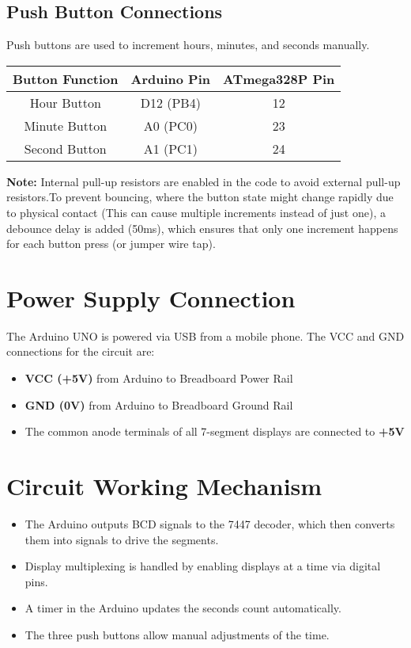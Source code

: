 \documentclass[a4paper,12pt]{article}
\theoremstyle{remark}
\begin{document}
\subsection{Push Button Connections}
Push buttons are used to increment hours, minutes, and seconds manually.
\begin{table}[h]
    \centering
    \begin{tabular}{|c|c|c|}
        \hline
        \textbf{Button Function} & \textbf{Arduino Pin} & \textbf{ATmega328P Pin} \\
        \hline
        Hour Button   & D12 (PB4)  & 12  \\
        Minute Button & A0 (PC0)   & 23  \\
        Second Button & A1 (PC1)   & 24  \\
        \hline
    \end{tabular}
    \label{tab:button_pins}
\end{table}

\textbf{Note:} Internal pull-up resistors are enabled in the code to avoid external pull-up resistors.To prevent bouncing, where the button
state might change rapidly due to physical contact (This can cause multiple increments instead of just one), a debounce delay is added (50ms), which ensures that only one increment happens for each button press (or jumper wire tap).

\section{Power Supply Connection}
The Arduino UNO is powered via USB from a mobile phone. The VCC and GND connections for the circuit are:
\begin{itemize}
    \item \textbf{VCC (+5V)} from Arduino to Breadboard Power Rail
    \item \textbf{GND (0V)} from Arduino to Breadboard Ground Rail
    \item The common anode terminals of all 7-segment displays are connected to \textbf{+5V}
\end{itemize}

\section{Circuit Working Mechanism}
\begin{itemize}
    \item The Arduino outputs BCD signals to the 7447 decoder, which then converts them into signals to drive the segments.
    \item Display multiplexing is handled by enabling displays at a time via digital pins.
    \item A timer in the Arduino updates the seconds count automatically.
    \item The three push buttons allow manual adjustments of the time.
\end{itemize}
\end{document}
